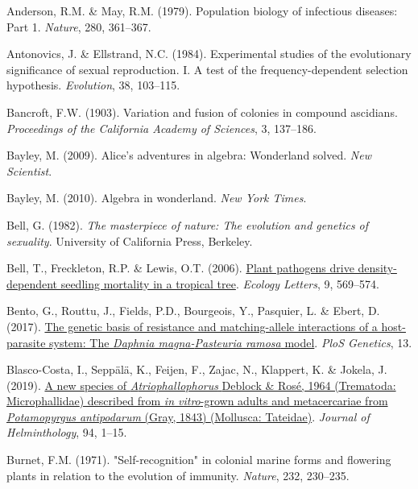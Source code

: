 \documentclass[
  american,
  letterpaper,
]{book}
\newlength{\cslhangindent}
\newenvironment{CSLReferences}[2] %
 {\begin{list}{}{%
  \setlength{\itemindent}{0pt}
  \setlength{\leftmargin}{0pt}
  \setlength{\parsep}{0pt}
  \ifodd #1
   \setlength{\leftmargin}{\cslhangindent}
   \setlength{\itemindent}{-1\cslhangindent}
  \fi
  \setlength{\itemsep}{#2\baselineskip}}}
 {\end{list}}
\begin{document}
\protect{}\label{refs}
\begin{CSLReferences}{1}{0}
Anderson, R.M. \& May, R.M. (1979). Population biology of infectious
diseases: Part 1. \emph{Nature}, 280, 361--367.

Antonovics, J. \& Ellstrand, N.C. (1984). Experimental studies of the
evolutionary significance of sexual reproduction. I. A test of the
frequency-dependent selection hypothesis. \emph{Evolution}, 38,
103--115.

Bancroft, F.W. (1903). Variation and fusion of colonies in compound
ascidians. \emph{Proceedings of the {California Academy of Sciences}},
3, 137--186.

Bayley, M. (2009). Alice's adventures in algebra: Wonderland solved.
\emph{New Scientist}.

Bayley, M. (2010). Algebra in wonderland. \emph{New York Times}.

Bell, G. (1982). \emph{The masterpiece of nature: The evolution and
genetics of sexuality}. University of California Press, Berkeley.

Bell, T., Freckleton, R.P. \& Lewis, O.T. (2006).
\href{https://doi.org/10.1111/j.1461-0248.2006.00905.x}{Plant pathogens
drive density-dependent seedling mortality in a tropical tree}.
\emph{Ecology Letters}, 9, 569--574.

Bento, G., Routtu, J., Fields, P.D., Bourgeois, Y., Pasquier, L. \&
Ebert, D. (2017).
\href{https://doi.org/10.1371/journal.pgen.1006596}{The genetic basis of
resistance and matching-allele interactions of a host-parasite system:
The \emph{{D}aphnia magna-{P}asteuria ramosa} model}. \emph{PloS
Genetics}, 13.

Blasco-Costa, I., Seppälä, K., Feijen, F., Zajac, N., Klappert, K. \&
Jokela, J. (2019). \href{https://doi.org/10.1017/S0022149X19000993}{A
new species of \emph{{A}triophallophorus} {Deblock \& Rosé}, 1964
({Trematoda: Microphallidae}) described from \emph{in vitro}-grown
adults and metacercariae from \emph{{P}otamopyrgus antipodarum} ({G}ray,
1843) ({Mollusca: Tateidae})}. \emph{Journal of Helminthology}, 94,
1--15.

Burnet, F.M. (1971). "Self-recognition" in colonial marine forms and
flowering plants in relation to the evolution of immunity.
\emph{Nature}, 232, 230--235.


\end{CSLReferences}
\end{document}
